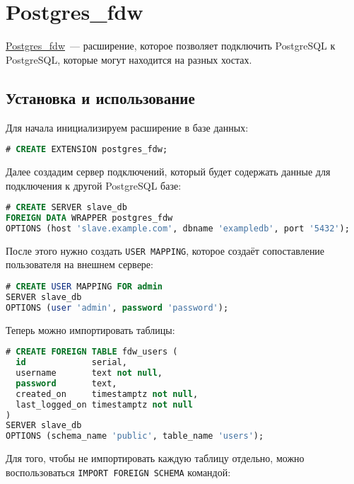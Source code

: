 \section{Postgres\_fdw}

\href{https://www.postgresql.org/docs/current/static/postgres-fdw.html}{Postgres\_fdw}~--- расширение, которое позволяет подключить PostgreSQL к PostgreSQL, которые могут находится на разных хостах.

\subsection{Установка и использование}

Для начала инициализируем расширение в базе данных:

\begin{lstlisting}[language=SQL,label=lst:postgresfdw1,caption=Инициализация postgres\_fdw]
# CREATE EXTENSION postgres_fdw;
\end{lstlisting}

Далее создадим сервер подключений, который будет содержать данные для подключения к другой PostgreSQL базе:

\begin{lstlisting}[language=SQL,label=lst:postgresfdw2,caption=Создание сервера]
# CREATE SERVER slave_db
FOREIGN DATA WRAPPER postgres_fdw
OPTIONS (host 'slave.example.com', dbname 'exampledb', port '5432');
\end{lstlisting}

После этого нужно создать \lstinline!USER MAPPING!, которое создаёт сопоставление пользователя на внешнем сервере:

\begin{lstlisting}[language=SQL,label=lst:postgresfdw3,caption=USER MAPPING]
# CREATE USER MAPPING FOR admin
SERVER slave_db
OPTIONS (user 'admin', password 'password');
\end{lstlisting}

Теперь можно импортировать таблицы:

\begin{lstlisting}[language=SQL,label=lst:postgresfdw4,caption=Импорт таблицы]
# CREATE FOREIGN TABLE fdw_users (
  id             serial,
  username       text not null,
  password       text,
  created_on     timestamptz not null,
  last_logged_on timestamptz not null
)
SERVER slave_db
OPTIONS (schema_name 'public', table_name 'users');
\end{lstlisting}

Для того, чтобы не импортировать каждую таблицу отдельно, можно воспользоваться \lstinline!IMPORT FOREIGN SCHEMA! командой:

